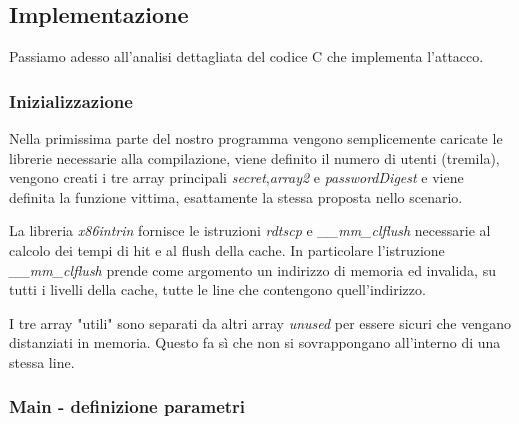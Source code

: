			\subsection{Implementazione}
				Passiamo adesso all'analisi dettagliata del codice C che implementa l'attacco.
				
				\subsubsection{Inizializzazione}
				
				Nella primissima parte del nostro programma vengono semplicemente caricate le librerie necessarie alla compilazione, viene definito il numero di utenti (tremila), vengono creati i tre array principali \emph{secret},\emph{array2} e \emph{passwordDigest} e viene definita la funzione vittima, esattamente la stessa proposta nello scenario.
				
 				La libreria \emph{x86intrin} fornisce le istruzioni \emph{rdtscp} e \emph{\_\_mm\_clflush} necessarie al calcolo dei tempi di hit e al flush della cache. In particolare l'istruzione \emph{\_\_mm\_clflush} prende come argomento un indirizzo di memoria ed invalida, su tutti i livelli della cache, tutte le line che contengono quell'indirizzo.
				
				I tre array "utili" sono separati da altri array \emph{unused} per essere sicuri che vengano distanziati in memoria. Questo fa sì che non si sovrappongano all'interno di una stessa line.
				
				\subsubsection{Main - definizione parametri}
				
